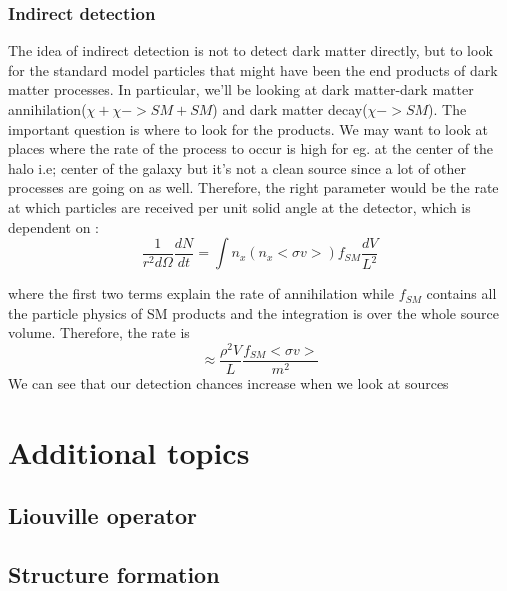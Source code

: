 \documentclass[12pt,a4paper,oneside]{book}
\begin{document}
\subsection{Indirect detection}
The idea of indirect detection is not to detect dark matter directly, but to look for the standard model particles that might have been the end products of dark matter processes. In particular, we'll be looking at dark matter-dark matter annihilation($\chi +\chi -> SM +SM$) and dark matter decay($\chi -> SM$).
 The important question is where to look for the products. We may want to look at places where the rate of the process to occur is high for eg. at the center of the halo i.e; center of the galaxy but it's not a clean source since a lot of other processes are going on as well. Therefore, the right parameter would be the rate at which particles are received per unit solid angle at the detector, which is dependent on :
\begin{equation}
    \frac{1}{r^2d\Omega}\frac{dN}{dt} = \int n_{x}(n_{x}<\sigma v>)f_{SM}\frac{dV}{L^2} 
\end{equation}
\par where the first two terms explain the rate of annihilation while $f_{SM}$ contains all the particle physics of SM products and the integration is over the whole source volume. Therefore, the rate is 
\begin{equation}
     \approx \frac{\rho^2 V}{L}\frac{f_{SM}<\sigma v>}{m^2}
\end{equation}
We can see that our detection chances increase when we look at sources 
\chapter{Additional topics}
\section{Liouville operator}
\section{Structure formation}

\end{document}

